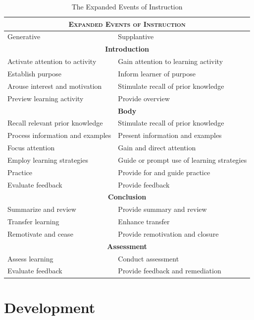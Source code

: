 \documentclass[12pt]{report} %
\begin{document}
\begin{table}
\begin{tabular}{| p{7cm} | p{7cm} |}
\hline
\multicolumn{2}{|c|}{\scshape Expanded Events of Instruction}\\ \hline
Generative & Supplantive \\ \hline
\multicolumn{2}{|c|}{\textbf{Introduction}} \\ \hline
Activate attention to activity & Gain attention to learning activity \\ \hline
Establish purpose & Inform learner of purpose \\ \hline
Arouse interest and motivation & Stimulate recall of prior knowledge \\ \hline
Preview learning activity & Provide overview \\ \hline
\multicolumn{2}{|c|}{\textbf{Body}} \\ \hline
Recall relevant prior knowledge & Stimulate recall of prior knowledge \\ \hline
Process information and examples & Present information and examples \\ \hline
Focus attention & Gain and direct attention \\ \hline
Employ learning strategies & Guide or prompt use of learning strategies \\ \hline
Practice & Provide for and guide practice \\ \hline
Evaluate feedback & Provide feedback \\ \hline
\multicolumn{2}{|c|}{\textbf{Conclusion}} \\ \hline
Summarize and review & Provide summary and review \\ \hline
Transfer learning & Enhance transfer \\ \hline
Remotivate and cease & Provide remotivation and closure \\ \hline
\multicolumn{2}{|c|}{\textbf{Assessment}} \\ \hline
Assess learning & Conduct assessment \\ \hline
Evaluate feedback & Provide feedback and remediation \\ \hline
\end{tabular}
\caption{\footnotesize The Expanded Events of Instruction \protect \cite{smithragan} \label{tab:eventsinstruction}}
\end{table}

\section{Development}
\end{document}
